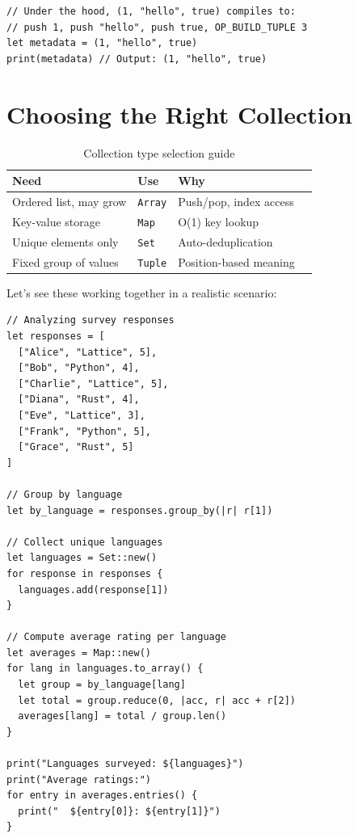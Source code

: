 \begin{lstlisting}[language=Lattice, caption={Tuples are compiled with OP\_BUILD\_TUPLE}]
// Under the hood, (1, "hello", true) compiles to:
// push 1, push "hello", push true, OP_BUILD_TUPLE 3
let metadata = (1, "hello", true)
print(metadata) // Output: (1, "hello", true)
\end{lstlisting}

\section{Choosing the Right Collection}\label{sec:choosing-collection}

\begin{table}[ht]
\centering
\begin{tabular}{llll}
\toprule
\textbf{Need} & \textbf{Use} & \textbf{Why} \\
\midrule
Ordered list, may grow & \lstinline|Array| & Push/pop, index access \\
Key-value storage & \lstinline|Map| & O(1) key lookup \\
Unique elements only & \lstinline|Set| & Auto-deduplication \\
Fixed group of values & \lstinline|Tuple| & Position-based meaning \\
\bottomrule
\end{tabular}
\caption{Collection type selection guide}\label{tab:collection-guide}
\end{table}

Let's see these working together in a realistic scenario:

\begin{lstlisting}[language=Lattice, caption={Collections working together}]
// Analyzing survey responses
let responses = [
  ["Alice", "Lattice", 5],
  ["Bob", "Python", 4],
  ["Charlie", "Lattice", 5],
  ["Diana", "Rust", 4],
  ["Eve", "Lattice", 3],
  ["Frank", "Python", 5],
  ["Grace", "Rust", 5]
]

// Group by language
let by_language = responses.group_by(|r| r[1])

// Collect unique languages
let languages = Set::new()
for response in responses {
  languages.add(response[1])
}

// Compute average rating per language
let averages = Map::new()
for lang in languages.to_array() {
  let group = by_language[lang]
  let total = group.reduce(0, |acc, r| acc + r[2])
  averages[lang] = total / group.len()
}

print("Languages surveyed: ${languages}")
print("Average ratings:")
for entry in averages.entries() {
  print("  ${entry[0]}: ${entry[1]}")
}
\end{lstlisting}

